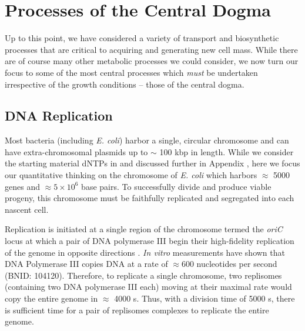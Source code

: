 \section{Processes of the Central Dogma}
Up to this point, we have considered a variety of transport and biosynthetic
processes that are critical to acquiring and generating new cell mass. While
there are of course many other metabolic processes we could consider, we now
turn our focus to some of the most central processes which \textit{must} be
undertaken irrespective of the growth conditions -- those of the central
dogma.

\subsection{DNA Replication}
Most bacteria (including \textit{E. coli}) harbor a single, circular chromosome
and can have extra-chromosomal plasmids up to $\sim$ 100 kbp in length. While
we consider the starting material dNTPs in  and
discussed further in Appendix , here we focus
our quantitative thinking on the chromosome of \textit{E. coli} which
harbors $\approx$ 5000 genes and $\approx 5\times 10^6$ base pairs. To
successfully divide and produce viable progeny, this chromosome must be
faithfully replicated and segregated into each nascent cell.


Replication is initiated at a single region of the chromosome termed the
\textit{oriC} locus at which a pair of DNA polymerase III begin their
high-fidelity replication of the genome in opposite directions \citep{fijalkowska2012}.
\textit{In vitro} measurements have shown that DNA
Polymerase III copies DNA at a rate of $\approx 600$ nucleotides per second
(BNID: 104120). Therefore, to replicate a single chromosome, two replisomes
(containing two DNA polymerase III each) moving at their maximal rate would copy
the entire genome in $\approx$ 4000 s. Thus, with a division time of 5000 s,
there is sufficient time
for a pair of replisomes complexes to replicate the entire genome.

